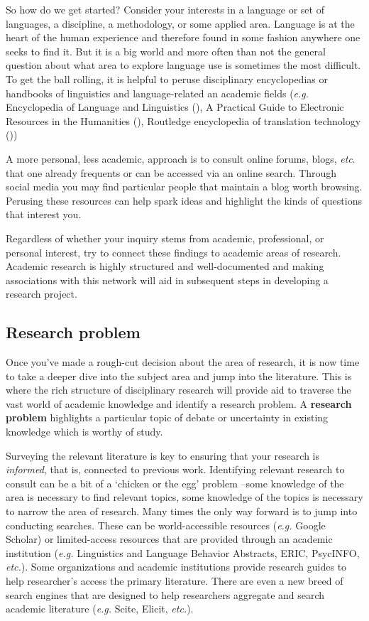 \documentclass[
  letterpaper,
]{latex/krantz}
\theoremstyle{definition}
\theoremstyle{remark}
\begin{document}
So how do we get started? Consider your interests in a language or set
of languages, a discipline, a methodology, or some applied area.
Language is at the heart of the human experience and therefore found in
some fashion anywhere one seeks to find it. But it is a big world and
more often than not the general question about what area to explore
language use is sometimes the most difficult. To get the ball rolling,
it is helpful to peruse disciplinary encyclopedias or handbooks of
linguistics and language-related an academic fields (\emph{e.g.}
Encyclopedia of Language and Linguistics (), A Practical Guide to Electronic Resources in the Humanities
(), Routledge
encyclopedia of translation technology ())

A more personal, less academic, approach is to consult online forums,
blogs, \emph{etc}. that one already frequents or can be accessed via an
online search. Through social media you may find particular people that
maintain a blog worth browsing. Perusing these resources can help spark
ideas and highlight the kinds of questions that interest you.

Regardless of whether your inquiry stems from academic, professional, or
personal interest, try to connect these findings to academic areas of
research. Academic research is highly structured and well-documented and
making associations with this network will aid in subsequent steps in
developing a research project.

\subsection{Research problem}\label{sec-fr-problem}

Once you've made a rough-cut decision about the area of research, it is
now time to take a deeper dive into the subject area and jump into the
literature. This is where the rich structure of disciplinary research
will provide aid to traverse the vast world of academic knowledge and
identify a research problem. A \textbf{research problem} highlights a
particular topic of debate or uncertainty in existing knowledge which is
worthy of study.

Surveying the relevant literature is key to ensuring that your research
is \emph{informed}, that is, connected to previous work. Identifying
relevant research to consult can be a bit of a `chicken or the egg'
problem --some knowledge of the area is necessary to find relevant
topics, some knowledge of the topics is necessary to narrow the area of
research. Many times the only way forward is to jump into conducting
searches. These can be world-accessible resources (\emph{e.g.} Google
Scholar) or limited-access resources that are provided through an
academic institution (\emph{e.g.} Linguistics and Language Behavior
Abstracts, ERIC, PsycINFO, \emph{etc.}). Some organizations and academic
institutions provide research guides to help researcher's access the
primary literature. There are even a new breed of search engines that
are designed to help researchers aggregate and search academic
literature (\emph{e.g.} Scite, Elicit, \emph{etc.}).
\end{document}
